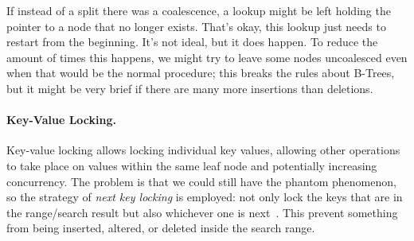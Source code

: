 If instead of a split there was a coalescence, a lookup might be left holding the pointer to a node that no longer exists. That's okay, this lookup just needs to restart from the beginning. It's not ideal, but it does happen. To reduce the amount of times this happens, we might try to leave some nodes uncoalesced even when that would be the normal procedure; this breaks the rules about B-Trees, but it might be very brief if there are many more insertions than deletions.

\paragraph{Key-Value Locking.} Key-value locking allows locking individual key values, allowing other operations to take place on values within the same leaf node and potentially increasing concurrency. The problem is that we could still have the phantom phenomenon, so the strategy of \textit{next key locking} is employed: not only lock the keys that are in the range/search result but also whichever one is next~\cite{dsc}. This prevent something from being inserted, altered, or deleted inside the search range. 




